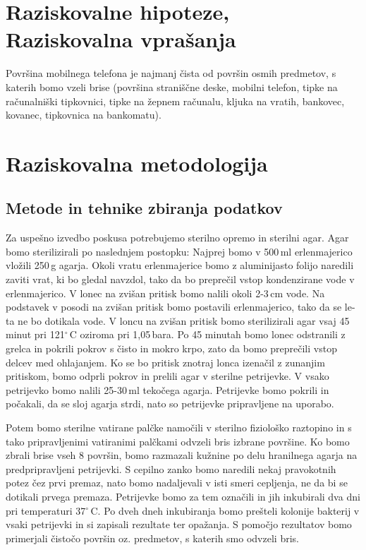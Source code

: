 \documentclass[12pt, a4paper, oneside]{report}
\begin{document}
\section{Raziskovalne hipoteze, Raziskovalna vprašanja}

Površina mobilnega telefona je najmanj čista od površin osmih predmetov, s katerih bomo vzeli brise (površina straniščne deske, mobilni telefon, tipke na računalniški tipkovnici, tipke na žepnem računalu, kljuka na vratih, bankovec, kovanec, tipkovnica na bankomatu).

\section{Raziskovalna metodologija}

\subsection{Metode in tehnike zbiranja podatkov}

Za uspešno izvedbo poskusa potrebujemo sterilno opremo in sterilni agar. Agar bomo sterilizirali po naslednjem postopku: Najprej bomo v 500\,ml erlenmajerico vložili 250\,g agarja. Okoli vratu erlenmajerice bomo z aluminijasto folijo naredili zaviti vrat, ki bo gledal navzdol, tako da bo preprečil vstop kondenzirane vode v erlenmajerico. V lonec na zvišan pritisk bomo nalili okoli 2-3\,cm vode. Na podstavek v posodi na zvišan pritisk bomo postavili erlenmajerico, tako da se le-ta ne bo dotikala vode. V loncu na zvišan pritisk bomo sterilizirali agar vsaj 45 minut pri 121$^\circ$\,C oziroma pri 1,05\,bara. Po 45 minutah bomo lonec odstranili z grelca in pokrili pokrov s čisto in mokro krpo, zato da bomo preprečili vstop delcev med ohlajanjem. Ko se bo pritisk znotraj lonca izenačil z zunanjim pritiskom, bomo odprli pokrov in prelili agar v sterilne petrijevke. V vsako petrijevko bomo nalili 25-30\,ml tekočega agarja. Petrijevke bomo pokrili in počakali, da se sloj agarja strdi, nato so petrijevke pripravljene na uporabo.

Potem bomo sterilne vatirane palčke namočili v sterilno fiziološko raztopino in s tako pripravljenimi vatiranimi palčkami odvzeli bris izbrane površine. Ko bomo zbrali brise vseh 8 površin, bomo razmazali kužnine po delu hranilnega agarja na predpripravljeni petrijevki. S cepilno zanko bomo naredili nekaj pravokotnih potez čez prvi premaz, nato bomo nadaljevali v isti smeri cepljenja, ne da bi se dotikali prvega premaza. Petrijevke bomo za tem označili in jih inkubirali dva dni pri temperaturi 37$^\circ$\,C. Po dveh dneh inkubiranja bomo prešteli kolonije bakterij v vsaki petrijevki in si zapisali rezultate ter opažanja. S pomočjo rezultatov bomo primerjali čistočo površin oz. predmetov, s katerih smo odvzeli bris.
\end{document}
